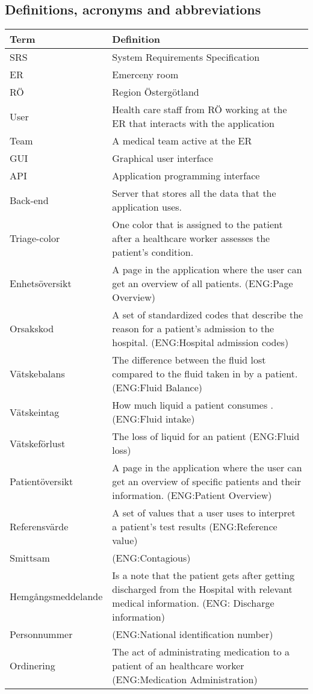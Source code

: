 \subsection{Definitions, acronyms and abbreviations}

\begin{tabularx}{1.0\textwidth} { 
  | >{\raggedright\arraybackslash}X 
  | >{\raddedright\arraybackslash}X 
  | }
 \hline
 \textbf{Term} & \textbf{Definition}\\
 \hline
 SRS  & System Requirements Specification  \\
 \hline
 ER & Emerceny room \\
 \hline
RÖ & Region Östergötland \\
\hline
User & Health care staff from RÖ working at the ER that interacts with the application \\
\hline
Team & A medical team active at the ER \\
\hline
GUI & Graphical user interface \\
\hline
API & Application programming interface \\\hline
Back-end & Server that stores all the data that the application uses. \\ 
\hline
Triage-color &  One color that is assigned to the patient after a healthcare worker assesses the patient's condition.\\
\hline
Enhetsöversikt &  A page in the application where the user can get an overview of all patients. (ENG:Page Overview)\\
\hline
Orsakskod & A set of standardized codes that describe the reason for a patient's admission to the hospital. (ENG:Hospital admission codes) \\
\hline
Vätskebalans & The difference between the fluid lost compared to the fluid taken in by a patient. (ENG:Fluid Balance)\\
\hline
Vätskeintag & How much liquid a patient consumes . (ENG:Fluid intake)\\
\hline
Vätskeförlust & The loss of liquid for an patient  (ENG:Fluid loss)\\
\hline
Patientöversikt & A page in the application where the user can get an overview of specific patients and their information. (ENG:Patient Overview)\\
\hline
Referensvärde & A set of values that a user uses to interpret a patient's test results (ENG:Reference value)\\
\hline
Smittsam & (ENG:Contagious)\\
\hline
Hemgångsmeddelande & Is a note that the patient gets after getting discharged from the Hospital with relevant medical information. (ENG: Discharge information)\\
\hline
Personnummer & (ENG:National identification number)\\
\hline
Ordinering & The act of administrating medication to a patient of an healthcare worker
 (ENG:Medication Administration)\\
\hline
\end{tabularx}

